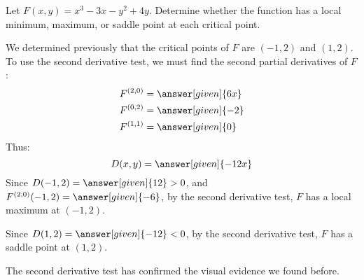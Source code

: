 \documentclass{ximera}
\begin{document}
\begin{example}
  Let $F(x,y) = x^3-3x-y^2+4y$. Determine whether the function has a
  local minimum, maximum, or saddle point at each critical point.
  \begin{explanation}
    We determined previously that the critical points of $F$ are
    $(-1,2)$ and $(1,2)$. To use the second derivative test, we must
    find the second partial derivatives of $F$:
    \begin{align*}
      F^{(2,0)} &= \answer[given]{6x}\\
      F^{(0,2)} &= \answer[given]{-2}\\
      F^{(1,1)} &= \answer[given]{0}
    \end{align*}
    Thus:
    \[
    D(x,y) = \answer[given]{-12x}
    \]
    Since $D(-1,2) = \answer[given]{12}>0$, and $F^{(2,0)}(-1,2) =
    \answer[given]{-6}$, by the second derivative test, $F$ has a
    local maximum at $(-1,2)$.
    
    Since $D(1,2) = \answer[given]{-12} <0$, by the second derivative test, $F$ has a saddle point at $(1,2)$.
    
    The second derivative test has confirmed the visual evidence we
    found before.
  \end{explanation}
\end{example}
\end{document}
